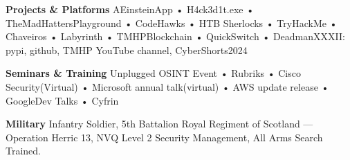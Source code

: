 \documentclass[12pt, a4paper]{article}
\begin{document}
\vspace{0.2cm}
\textcolor{blue}{\hrulefill}
\vspace{0.2cm}

\textbf{Projects \& Platforms}
AEinsteinApp • H4ck3d1t.exe • TheMadHattersPlayground • CodeHawks • HTB Sherlocks • TryHackMe • Chaveiros • Labyrinth • TMHPBlockchain • QuickSwitch • DeadmanXXXII: pypi, github, TMHP YouTube channel, CyberShorts2024

\vspace{0.2cm}

\textbf{Seminars \& Training}
Unplugged OSINT Event • Rubriks • Cisco Security(Virtual) • Microsoft annual talk(virtual) •  AWS update release • GoogleDev Talks • Cyfrin

\vspace{0.2cm}

\textbf{Military}
Infantry Soldier, 5th Battalion Royal Regiment of Scotland — Operation Herric 13, NVQ Level 2 Security Management, All Arms Search Trained.
\end{document}

